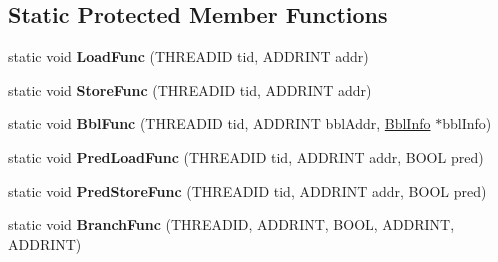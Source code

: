 \subsection*{Static Protected Member Functions}
\begin{DoxyCompactItemize}
\item 
\hypertarget{classSimpleCore_a8cffd62b7ec53e96dd4de5567e792a25}{static void {\bfseries Load\-Func} (T\-H\-R\-E\-A\-D\-I\-D tid, A\-D\-D\-R\-I\-N\-T addr)}\label{classSimpleCore_a8cffd62b7ec53e96dd4de5567e792a25}

\item 
\hypertarget{classSimpleCore_a4fc80cc9f07ac7c512821eb40d97a187}{static void {\bfseries Store\-Func} (T\-H\-R\-E\-A\-D\-I\-D tid, A\-D\-D\-R\-I\-N\-T addr)}\label{classSimpleCore_a4fc80cc9f07ac7c512821eb40d97a187}

\item 
\hypertarget{classSimpleCore_a3649ae716c7750b0c2b59faed5328cd1}{static void {\bfseries Bbl\-Func} (T\-H\-R\-E\-A\-D\-I\-D tid, A\-D\-D\-R\-I\-N\-T bbl\-Addr, \hyperlink{structBblInfo}{Bbl\-Info} $\ast$bbl\-Info)}\label{classSimpleCore_a3649ae716c7750b0c2b59faed5328cd1}

\item 
\hypertarget{classSimpleCore_af442156a052820f774963e9ea72a6e82}{static void {\bfseries Pred\-Load\-Func} (T\-H\-R\-E\-A\-D\-I\-D tid, A\-D\-D\-R\-I\-N\-T addr, B\-O\-O\-L pred)}\label{classSimpleCore_af442156a052820f774963e9ea72a6e82}

\item 
\hypertarget{classSimpleCore_a2dc9819b5cc0d522b77a45bc84de48fd}{static void {\bfseries Pred\-Store\-Func} (T\-H\-R\-E\-A\-D\-I\-D tid, A\-D\-D\-R\-I\-N\-T addr, B\-O\-O\-L pred)}\label{classSimpleCore_a2dc9819b5cc0d522b77a45bc84de48fd}

\item 
\hypertarget{classSimpleCore_a7a785c0ea70ef0025917906017f2d995}{static void {\bfseries Branch\-Func} (T\-H\-R\-E\-A\-D\-I\-D, A\-D\-D\-R\-I\-N\-T, B\-O\-O\-L, A\-D\-D\-R\-I\-N\-T, A\-D\-D\-R\-I\-N\-T)}\label{classSimpleCore_a7a785c0ea70ef0025917906017f2d995}

\end{DoxyCompactItemize}

